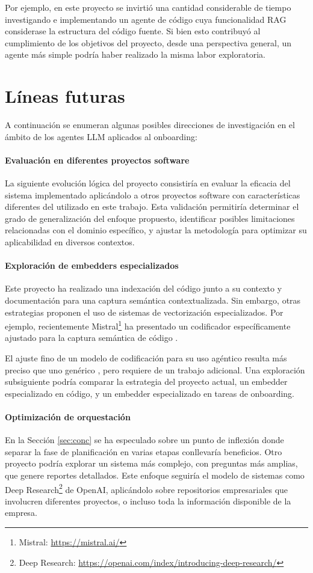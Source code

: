 Por ejemplo, en este proyecto se invirtió una cantidad considerable de tiempo investigando e implementando un agente de código cuya funcionalidad RAG considerase la estructura del código fuente. Si bien esto contribuyó al cumplimiento de los objetivos del proyecto, desde una perspectiva general, un agente más simple podría haber realizado la misma labor exploratoria.

\section{Líneas futuras}
A continuación se enumeran algunas posibles direcciones de investigación en el ámbito de los agentes LLM aplicados al onboarding:

\paragraph{Evaluación en diferentes proyectos software} La siguiente evolución lógica del proyecto consistiría en evaluar la eficacia del sistema implementado aplicándolo a otros proyectos software con características diferentes del utilizado en este trabajo. Esta validación permitiría determinar el grado de generalización del enfoque propuesto, identificar posibles limitaciones relacionadas con el dominio específico, y ajustar la metodología para optimizar su aplicabilidad en diversos contextos.

\paragraph{Exploración de embedders especializados} Este proyecto ha realizado una indexación del código junto a su contexto y documentación para una captura semántica contextualizada. Sin embargo, otras estrategias proponen el uso de sistemas de vectorización especializados. Por ejemplo, recientemente Mistral\footnote{Mistral: \url{https://mistral.ai/}} ha presentado un codificador específicamente ajustado para la captura semántica de código \cite{noauthor_codestral_nodate}.

El ajuste fino de un modelo de codificación para su uso agéntico resulta más preciso que uno genérico \cite{khattab_relevance-guided_2021,xiong_approximate_2020,yu_augmentation-adapted_2023}, pero requiere de un trabajo adicional. Una exploración subsiguiente podría comparar la estrategia del proyecto actual, un embedder especializado en código, y un embedder especializado en tareas de onboarding.

\paragraph{Optimización de orquestación} En la Sección \ref{sec:conc} se ha especulado sobre un punto de inflexión donde separar la fase de planificación en varias etapas conllevaría beneficios. Otro proyecto podría explorar un sistema más complejo, con preguntas más amplias, que genere reportes detallados. Este enfoque seguiría el modelo de sistemas como Deep Research\footnote{Deep Research: \url{https://openai.com/index/introducing-deep-research/}} de OpenAI, aplicándolo sobre repositorios empresariales que involucren diferentes proyectos, o incluso toda la información disponible de la empresa.

